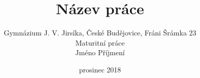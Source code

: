 \title{Název práce}
\author{Gymnázium J. V. Jirsíka, České Budějovice, Fráni Šrámka 23\\
	Maturitní práce\\
	Jméno Příjmení}
\date{prosinec 2018}